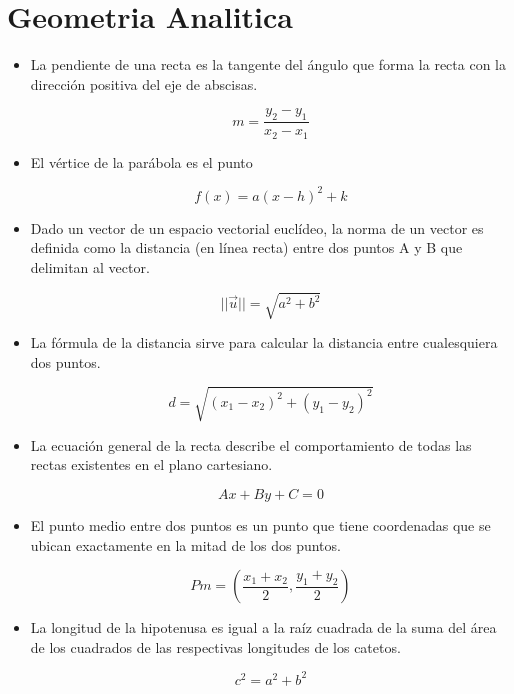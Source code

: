 \documentclass[letterpaper,12pt]{article}
\begin{document}
\newpage


\section{Geometria Analitica}

\begin{itemize}
  
 \item [\star]La pendiente de una recta es la tangente del ángulo  que forma la recta con la dirección positiva del eje de abscisas.
 
            $$ 	m=\frac{y_2-y_1}{x_2-x_1} $$
    
    \item [\bigstar]El vértice de la parábola es el punto
    
            $$ 	f(x) = a(x - h)^2 + k $$
    
    
    \item [\bullet]Dado un vector de un espacio vectorial euclídeo, la norma de un vector es definida como la distancia (en línea recta) entre dos puntos A y B que delimitan al vector.
    
            $$||\vec{u}||=\sqrt{a^{2}+b^{2}}$$
    
    
    
    
    \item [\circ] La fórmula de la distancia sirve para calcular la distancia entre cualesquiera dos puntos.
    
             $$ d=\sqrt{(x_1 - x_2)^2 + (y_1 - y_2)^2} $$
    
    \item [\triangleright]La ecuación general de la recta describe el comportamiento de todas las rectas existentes en el plano cartesiano.
    
            $$Ax+By+C=0$$
                  
                  
    \item[\lhd]El punto medio entre dos puntos es un punto que tiene coordenadas que se ubican exactamente en la mitad de los dos puntos.
      
            $$Pm=\left( \frac{x_{1}+x_{2}}{2},\frac{y_{1}+y_{2}}{2}\right)$$
    
    
    \item[\square]La longitud de la hipotenusa es igual a la raíz cuadrada de la suma del área de los cuadrados de las respectivas longitudes de los catetos. 
        
            $$c^{2}=a^{2}+b^{2}$$
\end{itemize}
\end{document}
